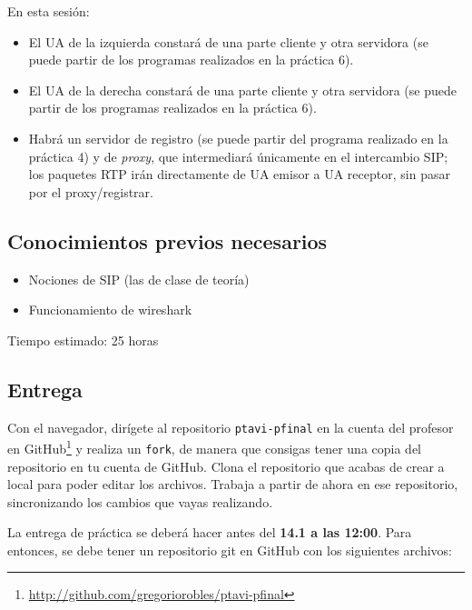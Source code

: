 \documentclass[a4paper,11pt]{article}
\begin{document}
En esta sesión:

\begin{itemize}
  \item El UA de la izquierda constará de una parte cliente y otra servidora (se puede partir de los programas realizados en la práctica 6).
  \item El UA de la derecha constará de una parte cliente y otra servidora (se puede partir de los programas realizados en la práctica 6).
  \item Habrá un servidor de registro (se puede partir del programa realizado en la práctica 4) y de \emph{proxy}, que intermediará únicamente en el intercambio SIP; los paquetes RTP irán directamente de UA emisor a UA receptor, sin pasar por el proxy/registrar.
\end{itemize}


\subsection{Conocimientos previos necesarios}

\begin{itemize}
  \item Nociones de SIP (las de clase de teoría)
  \item Funcionamiento de wireshark
\end{itemize}

Tiempo estimado: 25 horas


\subsection{Entrega}

Con el navegador, dirígete al repositorio \texttt{ptavi-pfinal} en la cuenta del profesor en GitHub\footnote{\url{http://github.com/gregoriorobles/ptavi-pfinal}} y realiza un \texttt{fork}, de manera que consigas tener una copia del repositorio en tu cuenta de GitHub. Clona el repositorio que acabas de crear a local para poder editar los archivos. Trabaja a partir de ahora en ese repositorio, sincronizando los cambios que vayas realizando.

La entrega de práctica se deberá hacer antes del {\bf 14.1 a las 12:00}. Para entonces, se debe tener un repositorio git en GitHub con los siguientes archivos:
\end{document}
